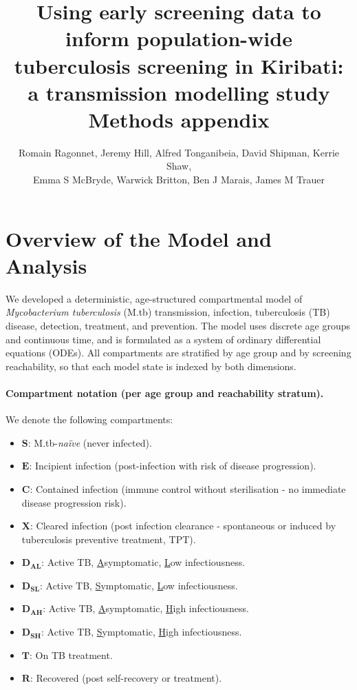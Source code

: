 \documentclass[11pt]{article}
\title{Using early screening data to inform population-wide tuberculosis screening in Kiribati: a transmission modelling study\\[0.6em]
\large Methods appendix}
\date{}
\author{Romain Ragonnet, Jeremy Hill, Alfred Tonganibeia, David Shipman, Kerrie Shaw,\\
Emma S McBryde, Warwick Britton, Ben J Marais, James M Trauer\\[0.6em]}
\begin{document}
 
\maketitle

\tableofcontents
\clearpage

\section{Overview of the Model and Analysis}

We developed a deterministic, age-structured compartmental model of \textit{Mycobacterium tuberculosis} (M.tb) transmission, infection, tuberculosis (TB) disease, detection, treatment, and prevention. The model uses discrete age groups and continuous time, and is formulated as a system of ordinary differential equations (ODEs). All compartments are stratified by age group and by screening reachability, so that each model state is indexed by both dimensions.

\paragraph{Compartment notation (per age group and reachability stratum).}
We denote the following compartments:
\begin{itemize}
    \item \(\mathbf{S}\): M.tb-\emph{na\"ive} (never infected).
    \item \(\mathbf{E}\): Incipient infection (post-infection with risk of disease progression).
    \item \(\mathbf{C}\): Contained infection (immune control without sterilisation - no immediate disease progression risk).
    \item \(\mathbf{X}\): Cleared infection (post infection clearance - spontaneous or induced by tuberculosis preventive treatment, TPT).
    \item \(\mathbf{D_{AL}}\): Active TB, \underline{A}symptomatic, \underline{L}ow infectiousness.
    \item \(\mathbf{D_{SL}}\): Active TB, \underline{S}ymptomatic, \underline{L}ow infectiousness.
    \item \(\mathbf{D_{AH}}\): Active TB, \underline{A}symptomatic, \underline{H}igh infectiousness.
    \item \(\mathbf{D_{SH}}\): Active TB, \underline{S}ymptomatic, \underline{H}igh infectiousness.
    \item \(\mathbf{T}\): On TB treatment.
    \item \(\mathbf{R}\): Recovered (post self-recovery or treatment).
\end{itemize}
\end{document}
